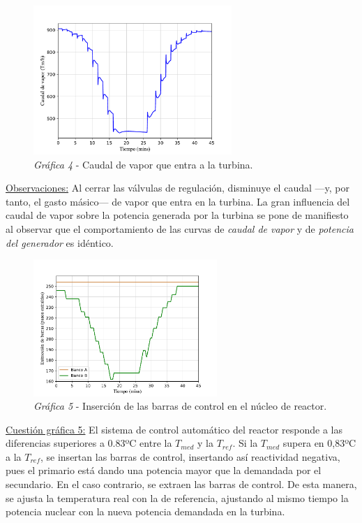 \begin{figure}[h]
  \centering
  \includegraphics[width=0.67\textwidth]{content/figures/sim1_vapor.pdf}
  \caption{\textit{Gráfica 4} - Caudal de vapor que entra a la turbina.}
  \label{fig:sim1_vapor}
\end{figure}

\underline{Observaciones:} Al cerrar las válvulas de regulación, disminuye el caudal ---y, por tanto, el gasto másico--- de vapor que entra en la turbina. La gran influencia del caudal de vapor sobre la potencia generada por la turbina se pone de manifiesto al observar que el comportamiento de las curvas de \textit{caudal de vapor} y de \textit{potencia del generador} es idéntico.

\begin{figure}[!h]
  \centering
  \includegraphics[width=0.62\textwidth]{content/figures/sim1_barras_control.pdf}
  \caption{\textit{Gráfica 5} - Inserción de las barras de control en el núcleo de reactor.}
  \label{fig:sim1_barras_control}
\end{figure}

\underline{Cuestión gráfica 5:} El sistema de control automático del reactor responde a las diferencias superiores a 0.83ºC entre la $T_{med}$ y la $T_{ref}$. Si la $T_{med}$ supera en 0,83ºC a la $T_{ref}$, se insertan las barras de control, insertando así reactividad negativa, pues el primario está dando una potencia mayor que la demandada por el secundario. En el caso contrario, se extraen las barras de control. De esta manera, se ajusta la temperatura real con la de referencia, ajustando al mismo tiempo la potencia nuclear con la nueva potencia demandada en la turbina.

